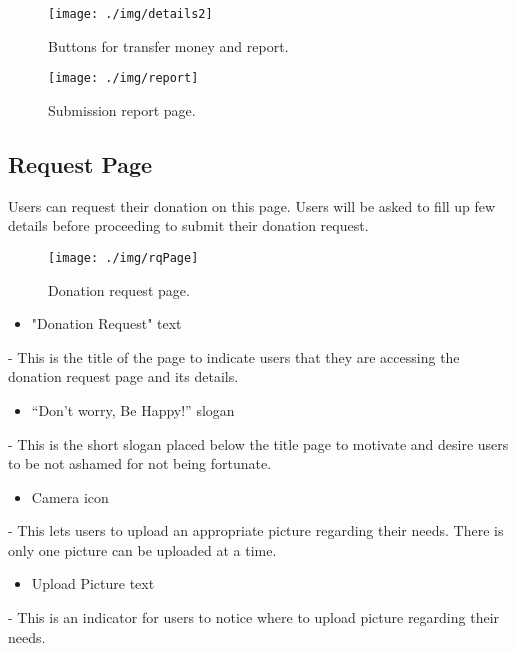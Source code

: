 \documentclass[conference]{IEEEtran}
\begin{document}
\begin{figure}[h!]
\texttt{[image: ./img/details2]}
\centering
\caption{Buttons for transfer money and report.}
\end{figure}

\begin{figure}[h!]
\texttt{[image: ./img/report]}
\centering
\caption{Submission report page.}
\end{figure}

\subsection{Request Page}

Users can request their donation on this page. Users will be asked to fill up few details before proceeding to submit their donation request.

\begin{figure}[h!]
\texttt{[image: ./img/rqPage]}
\centering
\caption{Donation request page.}
\end{figure}

\begin{itemize}
\item "Donation Request" text
\end{itemize}

- This is the title of the page to indicate users that they are accessing the donation request page and its details.\\

\begin{itemize}
\item “Don't worry, Be Happy!” slogan
\end{itemize}
- This is the short slogan placed below the title page to motivate and desire users to be not ashamed for not being fortunate. \\

\begin{itemize}
\item Camera icon
\end{itemize}
- This lets users to upload an appropriate picture regarding their needs. There is only one picture can be uploaded at a time.\\

\begin{itemize}
\item Upload Picture text
\end{itemize}
- This is an indicator for users to notice where to upload picture regarding their needs. \\
\end{document}
